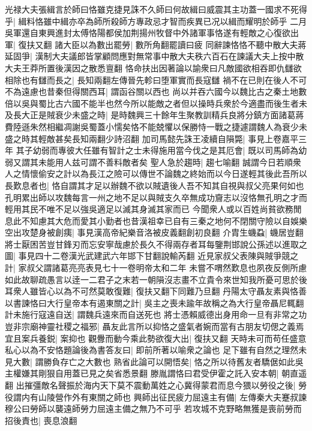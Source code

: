 光禄大夫張緝言於師曰恪雖克捷見誅不久師曰何故緝曰威震其主功蓋一國求不死得乎|{
	緝料恪雖中緝亦卒為師所殺師方專政忌才智而疾異已况以緝而耀明於師乎}
二月吳軍還自東興進封太傅恪陽都侯加荆揚州牧督中外諸軍事恪遂有輕敵之心復欲出軍|{
	復扶又翻}
諸大臣以為數出罷勞|{
	數所角翻罷讀曰疲}
同辭諫恪恪不聽中散大夫蔣延固爭|{
	漢制大夫議郎皆掌顧問應對無常事中散大夫秩六百石在諫議大夫上按中散大夫王莽所置後漢因之散悉亶翻}
恪命扶出因著論以諭衆曰凡敵國欲相吞即仇讎欲相除也有讎而長之|{
	長知兩翻左傳晉先軫曰堕軍實而長寇讎}
禍不在已則在後人不可不為遠慮也昔秦但得關西耳|{
	謂函谷關以西也}
尚以并吞六國今以魏比古之秦土地數倍以吳與蜀比古六國不能半也然今所以能敵之者但以操時兵衆於今適盡而後生者未及長大正是賊衰少未盛之時|{
	是時魏興三十餘年生聚教訓精兵良將分鎮方面諸葛蔣費陸遜朱然相繼凋謝吳蜀蓋小懦矣恪不能兢懼以保勝恃一戰之捷遽謂魏人為衰少未盛之時其輕敵甚矣長知兩翻少詩沼翻}
加司馬懿先誅王凌續自隕斃|{
	事見上卷嘉平三年}
其子幼弱而專彼大任雖有智計之士未得施用當今伐之是其厄會|{
	既以司馬師為幼弱又謂其未能用人兹可謂不善料敵者矣}
聖人急於趨時|{
	趨七喻翻}
誠謂今日若順衆人之情懷偷安之計以為長江之險可以傳世不論魏之終始而以今日遂輕其後此吾所以長歎息者也|{
	恪自謂其才足以辦魏不欲以賊遺後人吾不知其自視與叔父亮果何如也孔明累出師以攻魏每言一州之地不足以與賊支久卒無成功齎志以沒恪無孔明之才而輕用其民不唯不足以強吳適足以滅其身滅其家而已}
今聞衆人或以百姓尚貧欲務閒息此不知慮其大危而愛其小勤者也昔漢祖幸已自有三秦之地何不閉關守險以自娛樂空出攻楚身被創痍|{
	事見漢高帝紀樂音洛被皮義翻創初良翻}
介胄生蟣蝨|{
	蟣居豈翻}
將士厭困苦豈甘鋒刃而忘安寧哉慮於長久不得兩存者耳每鑒荆邯說公孫述以進取之圖|{
	事見四十二卷漢光武建武六年邯下甘翻說輸芮翻}
近見家叔父表陳與賊爭競之計|{
	家叔父謂諸葛亮亮表見七十一卷明帝太和二年}
未嘗不喟然歎息也夙夜反側所慮如此故聊疏愚言以逹一二君子之末若一朝隕沒志畫不立貴令來世知我所憂可思於後耳衆人雖皆心以為不可然莫敢復難|{
	復扶又翻下同難乃旦翻}
丹陽太守聶友素與恪善以書諫恪曰大行皇帝本有遏東關之計|{
	吳主之喪未踰年故稱之為大行皇帝聶尼輒翻}
計未施行寇遠自送|{
	謂魏兵遠來而自送死也}
將士憑賴威德出身用命一旦有非常之功豈非宗廟神靈社稷之福邪|{
	聶友此言所以抑恪之盛氣者婉而當有古朋友切偲之義焉}
宜且案兵養鋭|{
	案抑也}
觀釁而動今乘此勢欲復大出|{
	復扶又翻}
天時未可而苟任盛意私心以為不安恪題論後為書答友曰|{
	即前所著以喻衆之論也}
足下雖有自然之理然未見大數|{
	謂勝負存亡之大數也}
熟省此論可以開悟矣|{
	恪之所以待舊友者驕倨如此吳主權嫌其剛狠自用蓋已見之矣省悉景翻}
滕胤謂恪曰君受伊霍之託入安本朝|{
	朝直遥翻}
出摧彊敵名聲振於海内天下莫不震動萬姓之心冀得蒙君而息今猥以勞役之後|{
	勞役謂内有山陵營作外有東關之師也}
興師出征民疲力屈遠主有備|{
	左傳秦大夫蹇叔諫穆公曰勞師以襲遠師勞力屈遠主備之無乃不可乎}
若攻城不克野略無獲是喪前勞而招後責也|{
	喪息浪翻}
